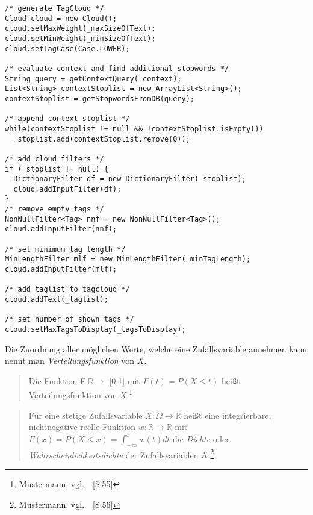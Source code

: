 \lstset{language=java}
\begin{lstlisting}[frame=htrbl, caption={Das Listing zeigt Java Quellcode}, label={lst:result2}]
/* generate TagCloud */
Cloud cloud = new Cloud();
cloud.setMaxWeight(_maxSizeOfText);
cloud.setMinWeight(_minSizeOfText);
cloud.setTagCase(Case.LOWER);

/* evaluate context and find additional stopwords */
String query = getContextQuery(_context);
List<String> contextStoplist = new ArrayList<String>();
contextStoplist = getStopwordsFromDB(query);

/* append context stoplist */
while(contextStoplist != null && !contextStoplist.isEmpty())
  _stoplist.add(contextStoplist.remove(0));

/* add cloud filters */
if (_stoplist != null) {
  DictionaryFilter df = new DictionaryFilter(_stoplist);
  cloud.addInputFilter(df);
}
/* remove empty tags */
NonNullFilter<Tag> nnf = new NonNullFilter<Tag>();
cloud.addInputFilter(nnf);

/* set minimum tag length */
MinLengthFilter mlf = new MinLengthFilter(_minTagLength);
cloud.addInputFilter(mlf);

/* add taglist to tagcloud */
cloud.addText(_taglist);

/* set number of shown tags */
cloud.setMaxTagsToDisplay(_tagsToDisplay);
\end{lstlisting}


Die Zuordnung aller möglichen Werte, welche eine Zufallsvariable annehmen kann nennt man \emph{Verteilungsfunktion} von \( X \).

\begin{quotation}
  Die Funktion F:\@ \( \mathbb{R} \rightarrow \) [0,1] mit \( F(t) = P (X \le t) \) heißt Verteilungsfunktion von \( X \).\footnote{Mustermann, vgl.~\cite{mm2009}~[S.55]}
\end{quotation}

\begin{quotation}
  Für eine stetige Zufallsvariable \( X: \Omega \rightarrow \mathbb{R} \) heißt eine integrierbare, nichtnegative reelle Funktion \( w: \mathbb{R} \rightarrow \mathbb{R} \) mit \( F(x) = P(X \le x) = \int_{-\infty}^{x} w(t)dt \) die \emph{Dichte} oder \emph{Wahrscheinlichkeitsdichte} der Zufallsvariablen \( X \).\footnote{Mustermann, vgl.~\cite{mf2005}~[S.56]}
\end{quotation}
